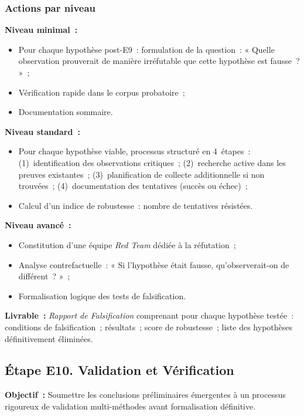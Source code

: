 \subsubsection*{Actions par niveau}

\textbf{Niveau minimal~:}
\begin{itemize}
    \item Pour chaque hypothèse post-E9~: formulation de la question~: « Quelle
          observation prouverait de manière irréfutable que cette hypothèse est
          fausse~? »~;
    \item Vérification rapide dans le corpus probatoire~;
    \item Documentation sommaire.
\end{itemize}

\textbf{Niveau standard~:}
\begin{itemize}
    \item Pour chaque hypothèse viable, processus structuré en 4~étapes~:
          (1)~identification des observations critiques~;
          (2)~recherche active dans les preuves existantes~;
          (3)~planification de collecte additionnelle si non trouvées~;
          (4)~documentation des tentatives (succès ou échec)~;
    \item Calcul d'un indice de robustesse~: nombre de tentatives résistées.
\end{itemize}

\textbf{Niveau avancé~:}
\begin{itemize}
    \item Constitution d'une équipe \textit{Red Team} dédiée à la réfutation~;
    \item Analyse contrefactuelle~: « Si l'hypothèse était fausse,
          qu'observerait-on de différent~? »~;
    \item Formalisation logique des tests de falsification.
\end{itemize}

\textbf{Livrable~:} \textit{Rapport de Falsification} comprenant pour chaque
hypothèse testée~: conditions de falsification~; résultats~; score de robustesse~;
liste des hypothèses définitivement éliminées.

\subsection{Étape E10. Validation et Vérification}

\textbf{Objectif~:} Soumettre les conclusions préliminaires émergentes à un
processus rigoureux de validation multi-méthodes avant formalisation définitive.

